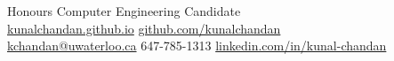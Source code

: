 \documentclass[]{chandan-cv}
\begin{document}
%
%

%
%
{
	Honours Computer Engineering Candidate \\
	\href{http://kunalchandan.github.io}{kunalchandan.github.io}
	\hfill
	\href{http://github.com/kunalchandan}{github.com/kunalchandan}\\
	\href{mailto:kchandan@uwaterloo.ca}{kchandan@uwaterloo.ca}
	\hfill
	647-785-1313
	\hfill
	\href{https://www.linkedin.com/in/kunal-chandan/}{linkedin.com/in/kunal-chandan}
}

%
%
\end{document}
